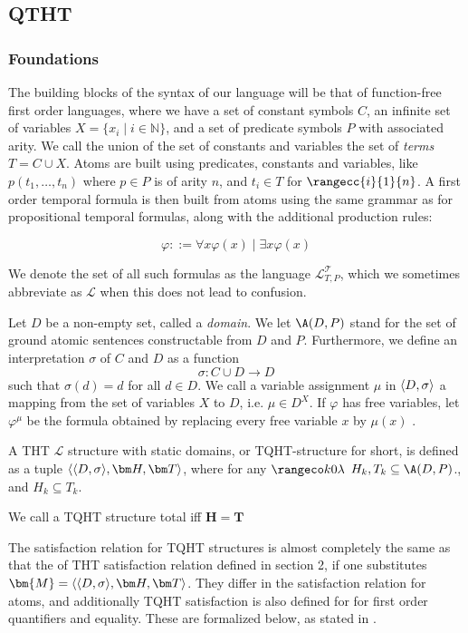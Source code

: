 \subsection{QTHT}

\subsubsection{Foundations}

The building blocks of the syntax of our language will be that of
function-free first order languages, where we have a set of constant
symbols $C$, an infinite set of variables
$X=\{x_i \mid i\in \mathbb{N} \}$, and a set of predicate symbols $P$
with associated arity. We call the union of the set of constants and
variables the set of \emph{terms} $T = C \cup X$. Atoms are built
using predicates, constants and variables, like $p(t_1,\dots, t_n)$
where $p\in P$ is of arity $n$, and $t_i \in T$ for
$\rangecc{i}{1}{n}$. A first order temporal formula is then built from
atoms using the same grammar as for propositional temporal formulas,
along with the additional production rules:

$$
\varphi ::= \forall x \varphi(x) \mid \exists x \varphi(x)
$$

We denote the set of all such formulas as the language
$\mathcal{L}_{T,P}^{\mathcal{T}}$, which we sometimes abbreviate as $\mathcal{L}$
when this does not lead to confusion.

Let $D$ be a non-empty set, called a \emph{domain}. We let $\A(D,P)$
stand for the set of ground atomic sentences constructable from $D$
and $P$. Furthermore, we define an interpretation $\sigma$ of $C$ and
$D$ as a function
$$
\sigma: C \cup D \rightarrow D
$$
such that $\sigma(d) = d$ for all $d \in D$. We call a variable
assignment $\mu$ in $\langle D, \sigma \rangle$ a mapping from the set of variables $X$ to
$D$, i.e. $\mu \in D^X$. If $\varphi$ has free variables, let $\varphi^\mu$ be the formula
obtained by replacing every free variable $x$ by $\mu(x)$
\cite{agcapevidi17a}.

\begin{definition}
  A THT $\mathcal{L}$ structure with static domains, or TQHT-structure
  for short, is defined as a tuple $\qthandt$, where for any
  $\kinlambda$ $H_k,T_k \subseteq \A(D,P)$., and $H_k \subseteq T_k$.

  We call a TQHT structure total iff $\bm{H}=\bm{T}$
\end{definition}


The satisfaction relation for TQHT structures is almost completely the
same as that the of THT satisfaction relation defined in section 2, if
one substitutes $\bm{M}=\qthandt$. They differ in the satisfaction
relation for atoms, and additionally TQHT satisfaction is also defined
for for first order quantifiers and equality. These are formalized
below, as stated in \cite{agcapevidi17a}.

